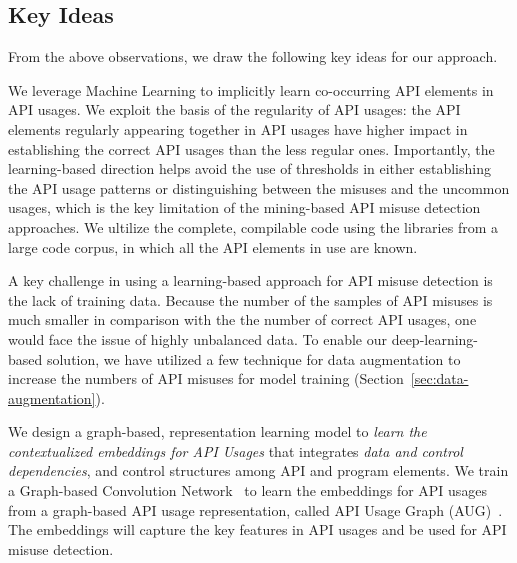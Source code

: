 \subsection{Key Ideas}
\label{sec:key-ideas}

From the above observations, we draw the following key ideas for our
approach.

\begin{key-idea}
We leverage Machine Learning to implicitly learn co-occurring API
elements in API usages. We exploit the basis of the regularity of API
usages: the API elements regularly appearing together in API usages
have higher impact in establishing the correct API usages than the
less regular ones. Importantly, the learning-based direction helps
avoid the use of thresholds in either establishing the API usage
patterns or distinguishing between the misuses and the uncommon
usages, which is the key limitation of the mining-based API misuse
detection approaches. We ultilize the complete, compilable code
using the libraries from a large code corpus, in which all the API
elements in use are known.
\end{key-idea}


\begin{key-idea}
A key challenge in using a learning-based approach for API misuse
detection is the lack of training data. Because the number of the
samples of API misuses is much smaller in comparison with the the
number of correct API usages, one would face the issue of highly
unbalanced data. To enable our deep-learning-based solution, we have
utilized a few technique for data augmentation to increase the numbers
of API misuses for model training
(Section~\ref{sec:data-augmentation}).
\end{key-idea}

\begin{key-idea}
We design a graph-based, representation learning model to {\em learn
  the contextualized embeddings for API Usages} that integrates {\em
  data and control dependencies}, and control structures among API and
program elements. We train a Graph-based Convolution
Network~\cite{gcn} to learn the embeddings for API usages from a
graph-based API usage representation, called API Usage Graph
(AUG)~\cite{msr19}. The embeddings will capture the key features
in API usages and be used for API misuse detection.
\end{key-idea}
